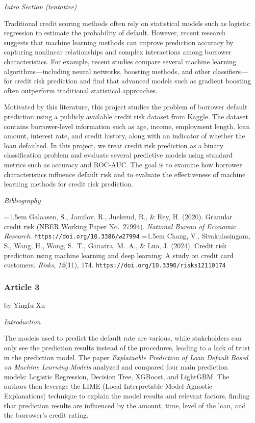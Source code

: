 \documentclass[letterpaper]{article}
\begin{document}
		\medskip
		
		\textit{Intro Section (tentative)}
		
		Traditional credit scoring methods often rely on statistical models such as logistic regression to estimate the probability of default. However, recent research suggests that machine learning methods can improve prediction accuracy by capturing nonlinear relationships and complex interactions among borrower characteristics. For example, recent studies compare several machine learning algorithms---including neural networks, boosting methods, and other classifiers---for credit risk prediction and find that advanced models such as gradient boosting often outperform traditional statistical approaches.
		
		Motivated by this literature, this project studies the problem of borrower default prediction using a publicly available credit risk dataset from Kaggle. The dataset contains borrower-level information such as age, income, employment length, loan amount, interest rate, and credit history, along with an indicator of whether the loan defaulted. In this project, we treat credit risk prediction as a binary classification problem and evaluate several predictive models using standard metrics such as accuracy and ROC-AUC. The goal is to examine how borrower characteristics influence default risk and to evaluate the effectiveness of machine learning methods for credit risk prediction.
		
		\bigskip
		
		\textit{Bibliography}
		
		\hangindent=1.5em
		Galaasen, S., Jamilov, R., Juelsrud, R., \& Rey, H. (2020). Granular credit risk (NBER Working Paper No.\ 27994). \textit{National Bureau of Economic Research}. \texttt{https://doi.org/10.3386/w27994}
		\hangindent=1.5em
		Chang, V., Sivakulasingam, S., Wang, H., Wong, S.~T., Ganatra, M.~A., \& Luo, J. (2024). Credit risk prediction using machine learning and deep learning: A study on credit card customers. \textit{Risks}, \textit{12}(11), 174. \texttt{https://doi.org/10.3390/risks12110174}
		
		\subsubsection{Article 3}
		
		{\color{deepred} by Yingfu Xu}
		
		
		\textit{Introduction}
		
		The models used to predict the default rate are various, while stakeholders can only see the prediction results instead of the procedures, leading to a lack of trust in the prediction model. The paper \textit{Explainable Prediction of Loan Default Based on Machine Learning Models} analyzed and compared four main prediction models: Logistic Regression, Decision Tree, XGBoost, and LightGBM. The authors then leverage the LIME (Local Interpretable Model-Agnostic Explanations) technique to explain the model results and relevant factors, finding that prediction results are influenced by the amount, time, level of the loan, and the borrower's credit rating.
		
\end{document}

